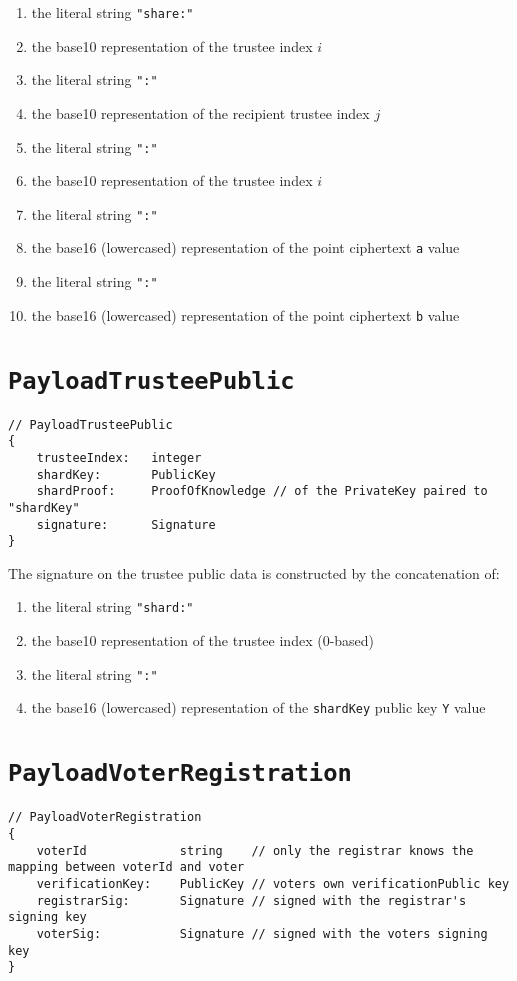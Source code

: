 \begin{enumerate}
    \item the literal string \lstinline[style=ES6]{"share:"}
    \item the base10 representation of the trustee index $i$
    \item the literal string \lstinline[style=ES6]{":"}
    \item the base10 representation of the recipient trustee index $j$
    \item the literal string \lstinline[style=ES6]{":"}
    \item the base10 representation of the trustee index $i$
    \item the literal string \lstinline[style=ES6]{":"}
    \item the base16 (lowercased) representation of the point ciphertext \texttt{a} value
    \item the literal string \lstinline[style=ES6]{":"}
    \item the base16 (lowercased) representation of the point ciphertext \texttt{b} value
\end{enumerate}

\section*{\texttt{PayloadTrusteePublic}}
\label{dt:payload:public}
\begin{lstlisting}[style=ES6]
// PayloadTrusteePublic
{
    trusteeIndex:   integer
    shardKey:       PublicKey
    shardProof:     ProofOfKnowledge // of the PrivateKey paired to "shardKey"
    signature:      Signature
}
\end{lstlisting}

The signature on the trustee public data is constructed by the concatenation of:

\begin{enumerate}
    \item the literal string \lstinline[style=ES6]{"shard:"}
    \item the base10 representation of the trustee index (0-based)
    \item the literal string \lstinline[style=ES6]{":"}
    \item the base16 (lowercased) representation of the \texttt{shardKey} public key \texttt{Y} value
\end{enumerate}

\section*{\texttt{PayloadVoterRegistration}}
\label{dt:payload:reg}
\begin{lstlisting}[style=ES6]
// PayloadVoterRegistration
{
    voterId             string    // only the registrar knows the mapping between voterId and voter
    verificationKey:    PublicKey // voters own verificationPublic key
    registrarSig:       Signature // signed with the registrar's signing key
    voterSig:           Signature // signed with the voters signing key
}
\end{lstlisting}

